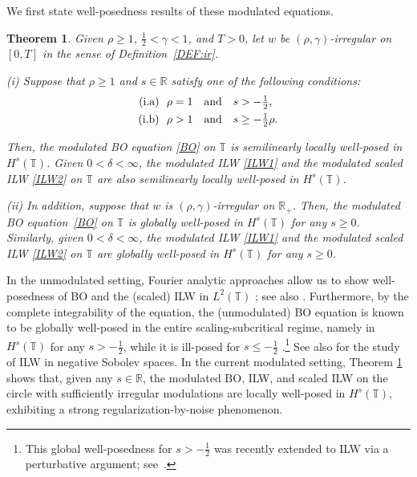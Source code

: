 \documentclass[letterpaper, 11pt,  reqno]{amsart}
\newtheorem{theorem}{Theorem} [section]
\newcommand{\1}{\hspace{0.5mm}\text{I}\hspace{0.5mm}}
\newcommand{\noi}{\noindent}
\newcommand{\R}{\mathbb{R}}
\newcommand{\T}{\mathbb{T}}
\newcommand{\dl}{\delta}
\newcommand{\g}{\gamma}
\numberwithin{equation}{section}
\numberwithin{theorem}{section}
\begin{document}
We first state well-posedness results
of these modulated equations.






\begin{theorem}
\label{THM:4}
Given $\rho \ge  1$, $\frac12< \g < 1$, and $T > 0$, 
let  $w$ be $(\rho,\g)$-irregular on $[0, T]$ in the sense of Definition~\ref{DEF:ir}.

\smallskip

\noi
\textup{(i)}
Suppose that $\rho \ge 1$ and $s\in \R$
satisfy one of the following conditions\textup{:}
\begin{align}
\begin{split}
\textup{(i.a)} &\ \   \rho =  1 \quad \text{and} \quad s > - \tfrac 12, \\
\textup{(i.b)} &\ \  \rho >  1 \quad  \text{and} \quad  s \ge - \tfrac 12 \rho.
\end{split}
\label{regBO1}
\end{align}

\noi
Then, the modulated BO equation \eqref{BO}
on  $\T$
is semilinearly  locally well-posed in $H^s(\T)$.
Given $0 < \dl < \infty$, 
the modulated 
ILW \eqref{ILW1}
and
the modulated 
scaled ILW \eqref{ILW2}
on  $\T$
are also semilinearly  locally well-posed in $H^s(\T)$.




\smallskip


\noi
\textup{(ii)}
In addition, suppose that 
  $w$ is $(\rho,\g)$-irregular on $\R_+$.
Then, the modulated BO equation~\eqref{BO} 
on $\T$ is globally well-posed in $H^s(\T)$ for any $s \ge 0$.
Similarly, 
given $0 < \dl < \infty$, 
the modulated 
ILW \eqref{ILW1}
and
the modulated 
scaled ILW \eqref{ILW2}
on $\T$ are globally well-posed in $H^s(\T)$ for any $s \ge 0$.



\end{theorem}




In the unmodulated setting, 
Fourier analytic approaches
allow us to show well-posedness of 
BO and the (scaled) ILW  in $L^2(\T)$
\cite{Moli1, Moli2, MP, CLOP};
see also \cite{Deng15}.
Furthermore, 
by the complete integrability of the equation, 
the (unmodulated) BO equation 
is known to be globally well-posed
in the entire scaling-subcritical regime, 
namely in $H^s(\T)$ for any $s > - \frac 12$, 
while it is ill-posed for $s \le -\frac 12$
\cite{GKT23, KLV}.\footnote{This global well-posedness
for $s > - \frac 12$ was recently extended to ILW via a perturbative
argument; see~\cite{GL}.}
See also \cite{CFLOP}
for the study of ILW in negative Sobolev spaces.
In the current modulated setting, 
Theorem \ref{THM:4}
shows that, 
 given  any $s \in \R$, 
the modulated BO, ILW, and scaled ILW
on  the circle
with sufficiently irregular modulations
are locally well-posed in $H^s(\T)$, 
exhibiting a strong regularization-by-noise phenomenon.
\end{document}
